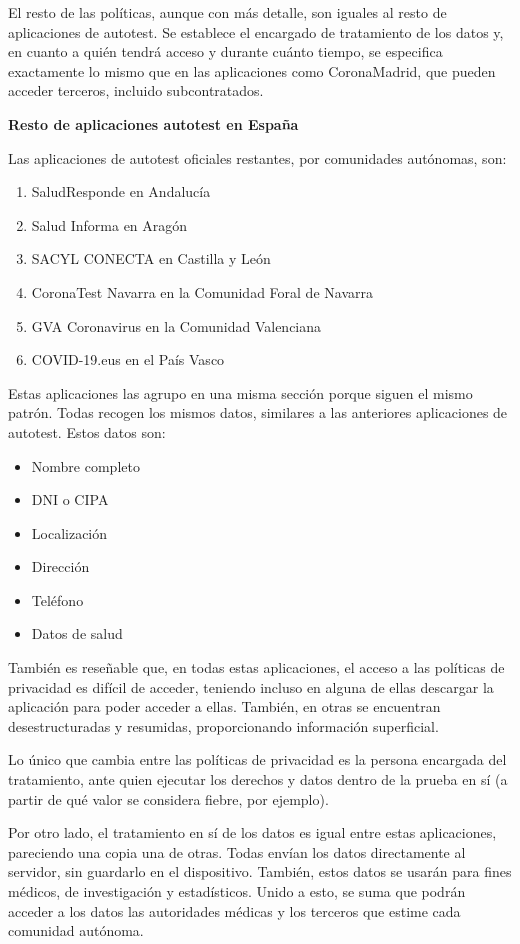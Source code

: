 \documentclass[11pt,a4paper,spanish]{article}
\begin{document}
El resto de las políticas, aunque con más detalle, son iguales al resto de aplicaciones de autotest. Se establece el encargado de tratamiento de los datos y, en cuanto a quién tendrá acceso y durante cuánto tiempo, se especifica exactamente lo mismo que en las aplicaciones como CoronaMadrid, que pueden acceder terceros, incluido subcontratados.

\textbf{Resto de aplicaciones autotest en España}

Las aplicaciones de autotest oficiales restantes, por comunidades autónomas, son:

\begin{enumerate}
\item SaludResponde en Andalucía
\item Salud Informa en Aragón
\item SACYL CONECTA en Castilla y León
\item CoronaTest Navarra en la Comunidad Foral de Navarra
\item GVA Coronavirus en la Comunidad Valenciana
\item COVID-19.eus en el País Vasco
\end{enumerate} 

Estas aplicaciones las agrupo en una misma sección porque siguen el mismo patrón. Todas recogen los mismos datos, similares a las anteriores aplicaciones de autotest. Estos datos son:

\begin{itemize}
\item Nombre completo
\item DNI o CIPA
\item Localización
\item Dirección
\item Teléfono
\item Datos de salud
\end{itemize}

También es reseñable que, en todas estas aplicaciones, el acceso a las políticas de privacidad es difícil de acceder, teniendo incluso en alguna de ellas descargar la aplicación para poder acceder a ellas. También, en otras se encuentran desestructuradas y resumidas, proporcionando información superficial.

Lo único que cambia entre las políticas de privacidad es la persona encargada del tratamiento, ante quien ejecutar los derechos y datos dentro de la prueba en sí (a partir de qué valor se considera fiebre, por ejemplo).

Por otro lado, el tratamiento en sí de los datos es igual entre estas aplicaciones, pareciendo una copia una de otras. Todas envían los datos directamente al servidor, sin guardarlo en el dispositivo. También, estos datos se usarán para fines médicos, de investigación y estadísticos. Unido a esto, se suma que podrán acceder a los datos las autoridades médicas y los terceros que estime cada comunidad autónoma.
\end{document}
